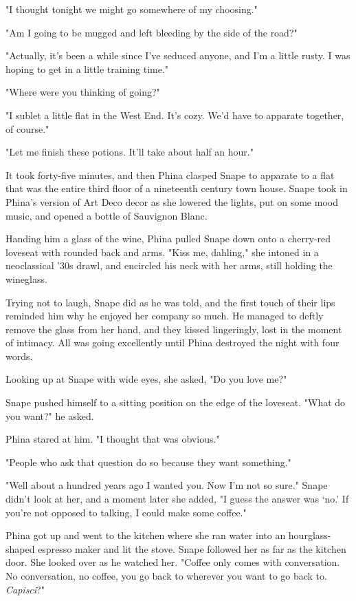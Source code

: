 \documentclass[a4paper,11pt]{article}
\begin{document}
"I thought tonight we might go somewhere of my choosing."

"Am I going to be mugged and left bleeding by the side of the road?"

"Actually, it's been a while since I've seduced anyone, and I'm a little rusty. I was hoping to get in a little training time."

"Where were you thinking of going?"

"I sublet a little flat in the West End. It's cozy. We'd have to apparate together, of course."

"Let me finish these potions. It'll take about half an hour."

It took forty-five minutes, and then Phina clasped Snape to apparate to a flat that was the entire third floor of a nineteenth century town house. Snape took in Phina's version of Art Deco decor as she lowered the lights, put on some mood music, and opened a bottle of Sauvignon Blanc.

Handing him a glass of the wine, Phina pulled Snape down onto a cherry-red loveseat with rounded back and arms. "Kiss me, dahling," she intoned in a neoclassical '30s drawl, and encircled his neck with her arms, still holding the wineglass.

Trying not to laugh, Snape did as he was told, and the first touch of their lips reminded him why he enjoyed her company so much. He managed to deftly remove the glass from her hand, and they kissed lingeringly, lost in the moment of intimacy. All was going excellently until Phina destroyed the night with four words.

Looking up at Snape with wide eyes, she asked, "Do you love me?"

Snape pushed himself to a sitting position on the edge of the loveseat. "What do you want?" he asked.

Phina stared at him. "I thought that was obvious."

"People who ask that question do so because they want something."

"Well about a hundred years ago I wanted you. Now I'm not so sure." Snape didn't look at her, and a moment later she added, "I guess the answer was `no.' If you're not opposed to talking, I could make some coffee."

Phina got up and went to the kitchen where she ran water into an hourglass-shaped espresso maker and lit the stove. Snape followed her as far as the kitchen door. She looked over as he watched her. "Coffee only comes with conversation. No conversation, no coffee, you go back to wherever you want to go back to. \emph{Capisci}?"
\end{document}
